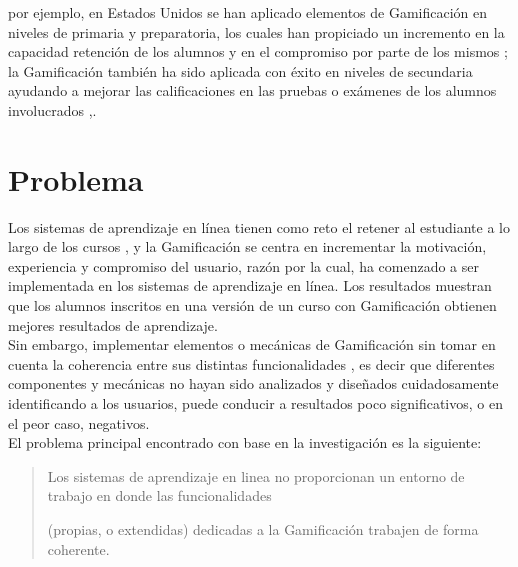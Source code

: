 por ejemplo, en Estados Unidos se han aplicado elementos de Gamificación en niveles de primaria y preparatoria, los cuales han propiciado un incremento en la capacidad retención de los alumnos y en el compromiso por parte de los mismos \cite{education3};
la Gamificación también ha sido aplicada con éxito en niveles de secundaria ayudando a mejorar las calificaciones en las pruebas o exámenes de los alumnos involucrados \cite{education2},\cite{education5}.

\section{Problema}
\label{sec:problematica}

    Los sistemas de aprendizaje en línea tienen como reto el retener al estudiante a lo largo de los cursos \cite{problematica1}, y la Gamificación se centra en incrementar la motivación, experiencia y compromiso del usuario, razón por la cual, ha comenzado a ser implementada en los sistemas de aprendizaje en línea. Los resultados muestran que los alumnos inscritos en una versión de un curso con Gamificación obtienen mejores resultados de aprendizaje. \cite{problematica2}\\
    
    \noindent Sin embargo, implementar elementos o mecánicas de Gamificación sin tomar en cuenta la coherencia entre sus distintas funcionalidades \cite{FrameWorkForTheWin}, es decir que diferentes componentes y mecánicas no hayan sido analizados y diseñados cuidadosamente identificando a los usuarios, puede conducir a resultados poco significativos, o en el peor caso, negativos. \cite{problematica3}\\
    
    \noindent El problema principal encontrado con base en la investigación %
    es la siguiente:
    
    \begin{quote}
    \colorbox{blue!05}{\parbox{\dimexpr\linewidth-2\fboxsep}{\strut
    Los sistemas de aprendizaje en linea
    no proporcionan un entorno de trabajo en donde las funcionalidades\par (propias, %
    o extendidas) dedicadas a la Gamificación trabajen de forma coherente\cite{coherencia}.
    \strut}}%
    \end{quote}

